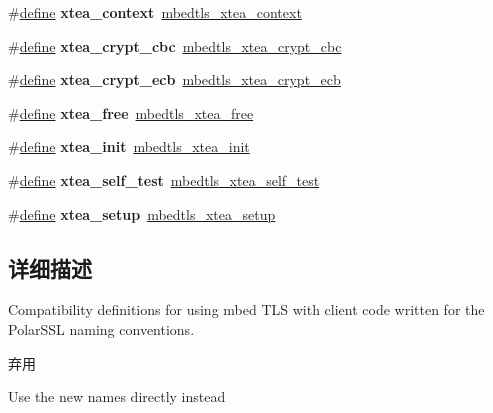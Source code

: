 \begin{DoxyCompactItemize}
\#\hyperlink{structdefine}{define} {\bfseries xtea\+\_\+context}~\hyperlink{structmbedtls__xtea__context}{mbedtls\+\_\+xtea\+\_\+context}
\item 
\mbox{\label{compat-1_83_8h_a3fa01f3da535e980217f7d61975bf6ea}} 
\#\hyperlink{structdefine}{define} {\bfseries xtea\+\_\+crypt\+\_\+cbc}~\hyperlink{xtea_8h_ad0458b0fba8f223b9343e06e714f50e9}{mbedtls\+\_\+xtea\+\_\+crypt\+\_\+cbc}
\item 
\mbox{\label{compat-1_83_8h_a75ee8c3dfdaf96ea8b23f56520647b41}} 
\#\hyperlink{structdefine}{define} {\bfseries xtea\+\_\+crypt\+\_\+ecb}~\hyperlink{xtea_8h_a73a0ce1ac62aa079107736ef2aa4b21d}{mbedtls\+\_\+xtea\+\_\+crypt\+\_\+ecb}
\item 
\mbox{\label{compat-1_83_8h_ad8792479359b600eb546545eaec49700}} 
\#\hyperlink{structdefine}{define} {\bfseries xtea\+\_\+free}~\hyperlink{xtea_8h_a55eea1f415f3ed5dbf488fa0d9fb5cab}{mbedtls\+\_\+xtea\+\_\+free}
\item 
\mbox{\label{compat-1_83_8h_a48a65d9300f9ee7c2dcc15ebbd2ff301}} 
\#\hyperlink{structdefine}{define} {\bfseries xtea\+\_\+init}~\hyperlink{xtea_8h_ade30d4f60411e181757ffab0da902e75}{mbedtls\+\_\+xtea\+\_\+init}
\item 
\mbox{\label{compat-1_83_8h_afd9cf0242d1e9e92351be3a2da242beb}} 
\#\hyperlink{structdefine}{define} {\bfseries xtea\+\_\+self\+\_\+test}~\hyperlink{xtea_8h_ac9684542d55cc9d81ea8260f70a4a239}{mbedtls\+\_\+xtea\+\_\+self\+\_\+test}
\item 
\mbox{\label{compat-1_83_8h_a821b8c5bba5a08b8df9ba0d1a1b9c3d4}} 
\#\hyperlink{structdefine}{define} {\bfseries xtea\+\_\+setup}~\hyperlink{xtea_8h_a3de8a424080f233f2a71c76b93bab130}{mbedtls\+\_\+xtea\+\_\+setup}
\end{DoxyCompactItemize}


\subsection{详细描述}
Compatibility definitions for using mbed T\+LS with client code written for the Polar\+S\+SL naming conventions. 

\begin{DoxyRefDesc}{弃用}
\item[\hyperlink{deprecated__deprecated000001}{弃用}]Use the new names directly instead\end{DoxyRefDesc}


